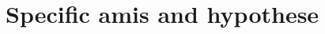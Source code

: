 \documentclass{article}
\begin{document}
\section{Specific amis and hypothese}
























\end{document}
